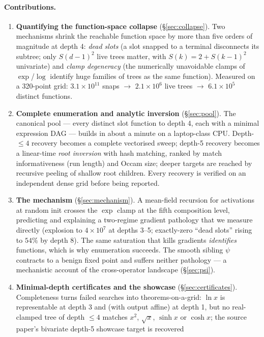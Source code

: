 \documentclass[11pt]{article}
\begin{document}
\paragraph{Contributions.}
\begin{enumerate}
\item \textbf{Quantifying the function-space collapse}
  (\S\ref{sec:collapse}). Two mechanisms shrink the reachable
  function space by more than five orders of magnitude at depth 4:
  \emph{dead slots} (a slot snapped to a terminal disconnects its
  subtree; only $S(d{-}1)^2$ live trees matter, with
  $S(k)=2+S(k-1)^2$ univariate) and \emph{clamp degeneracy} (the
  numerically unavoidable clamps of $\exp$/$\log$ identify huge
  families of trees as the same function). Measured on a 320-point
  grid: $3.1\times10^{11}$ snaps $\to$ $2.1\times10^{6}$ live trees
  $\to$ $6.1\times10^{5}$ distinct functions.
\item \textbf{Complete enumeration and analytic inversion}
  (\S\ref{sec:pool}). The canonical pool — every distinct slot
  function to depth 4, each with a minimal expression DAG — builds in
  about a minute on a laptop-class CPU. Depth-$\le4$ recovery becomes
  a complete vectorised sweep; depth-5 recovery becomes a linear-time
  \emph{root inversion} with hash matching, ranked by match
  informativeness (run length) and Occam size; deeper targets are
  reached by recursive peeling of shallow root children. Every
  recovery is verified on an independent dense grid before being
  reported.
\item \textbf{The mechanism} (\S\ref{sec:mechanism}). A mean-field
  recursion for activations at random init crosses the $\exp$ clamp at
  the fifth composition level, predicting and explaining a two-regime
  gradient pathology that we measure directly (explosion to
  $4\times10^{7}$ at depths 3--5; exactly-zero ``dead slots'' rising
  to $54\%$ by depth 8). The same saturation that kills gradients
  \emph{identifies} functions, which is why enumeration succeeds.
  The smooth sibling $\psi$ contracts to a benign fixed point and
  suffers neither pathology — a mechanistic account of the
  cross-operator landscape (\S\ref{sec:psi}).
\item \textbf{Minimal-depth certificates and the showcase}
  (\S\ref{sec:certificates}). Completeness turns failed searches into
  theorems-on-a-grid: $\ln x$ is representable at depth 3 and (with
  output affine) at depth 1, but no real-clamped tree of depth
  $\le 4$ matches $x^2$, $\sqrt{x}$, $\sinh x$ or $\cosh x$; the
  source paper's bivariate depth-5 showcase target is recovered

\end{enumerate}
\end{document}
